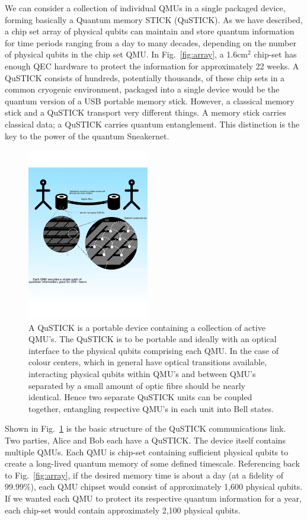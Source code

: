 \documentclass[twocolumn, aps, rmp, amsmath, amssymb, nofootinbib, superscriptaddress, longbibliography, floatfix, table-of-contents, eqsecnum]{revtex4-2}
\begin{document}
We can consider a collection of individual QMUs in a single packaged device, forming basically a Quantum memory STICK (QuSTICK). As we have described, a chip set array of physical qubits can maintain and store quantum information for time periods ranging from a day to many decades, depending on the number of physical qubits in the chip set QMU. In Fig.~\ref{fig:array}, a 1.6cm$^2$ chip-set has enough QEC hardware to protect the information for approximately 22 weeks. A QuSTICK consists of hundreds, potentially thousands, of these chip sets in a common cryogenic environment, packaged into a single device would be the quantum version of a USB portable memory stick. However, a classical memory stick and a QuSTICK transport very different things. A memory stick carries classical data; a QuSTICK carries quantum entanglement. This distinction is the key to the power of the quantum Sneakernet. 

\begin{figure}[htbp!]
	\includegraphics[clip=true, width=0.475\textwidth]{qustick1}
	\caption{A QuSTICK is a portable device containing a collection of active QMU's.  The QuSTICK is to be portable and ideally with an optical interface to the physical qubits comprising each QMU.  In the case of colour centers, which in general have optical transitions available, interacting physical qubits within QMU's and between QMU's separated by a small amount of optic fibre should be nearly identical.  Hence two separate QuSTICK units can be coupled together, entangling respective QMU's in each unit into Bell states.} \label{fig:qustick1}
\end{figure}

Shown in Fig.~\ref{fig:qustick1} is the basic structure of the QuSTICK communications link. Two parties, Alice and Bob each have a QuSTICK. The device itself contains multiple QMUs. Each QMU is chip-set containing sufficient physical qubits to create a long-lived quantum memory of some defined timescale. Referencing back to Fig.~\ref{fig:array}, if the desired memory time is about a day (at a fidelity of $99.99\%$), each QMU chipset would consist of approximately 1,600 physical qubits. If we wanted each QMU to protect its respective quantum information for a year, each chip-set would contain approximately 2,100 physical qubits. 
\end{document}
